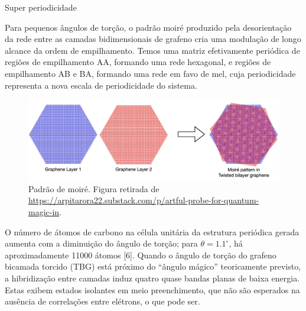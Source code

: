 \documentclass[10pt,aspectratio=169,xcolor={table,dvipsnames,usenames}]{beamer}
\begin{document}

\begin{frame}{Super periodicidade}

Para pequenos ângulos de torção, o padrão moiré produzido pela desorientação da rede entre as camadas bidimensionais de grafeno cria uma modulação de longo alcance da ordem de empilhamento. Temos uma matriz efetivamente periódica de regiões de empilhamento AA, formando uma rede hexagonal, e regiões de empilhamento AB e BA, formando uma rede em favo de mel, cuja periodicidade representa a nova escala de periodicidade do sistema.

\begin{figure}[H]
\centering
\includegraphics[height=0.32\linewidth]{fig/moire.png}
\caption{Padrão de moiré. Figura retirada de \url{https://arpitarora22.substack.com/p/artful-probe-for-quantum-magic-in}.}
\label{fig:moire}
\end{figure}


O número de átomos de carbono na célula unitária da estrutura periódica gerada aumenta com a diminuição do ângulo de torção; para $\theta=1.1^\circ$, há aproximadamente 11000 átomos [6]. Quando o ângulo de torção do grafeno bicamada torcido (TBG) está próximo do ``ângulo mágico'' teoricamente previsto, a hibridização entre camadas induz quatro quase bandas planas de baixa energia. Estas exibem estados isolantes em meio preenchimento, que não são esperados na ausência de correlações entre elétrons, o que pode ser.

\end{frame}


\end{document}
